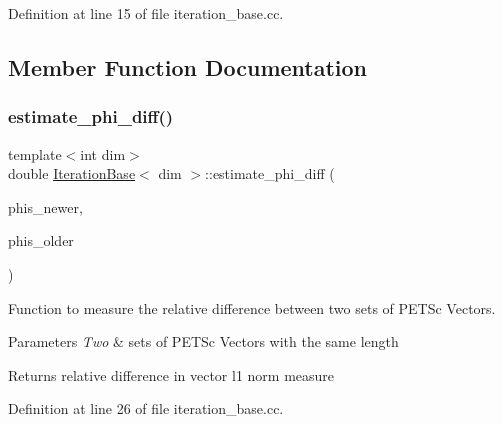 Definition at line 15 of file iteration\+\_\+base.\+cc.



\subsection{Member Function Documentation}
\mbox{\label{class_iteration_base_a8bcba214850c5d47f5ae38fb98f51a44}} 
\subsubsection{\texorpdfstring{estimate\+\_\+phi\+\_\+diff()}{estimate\_phi\_diff()}\hspace{0.1cm}{\footnotesize\ttfamily [1/4]}}
{\footnotesize\ttfamily template$<$int dim$>$ \\
double \hyperlink{class_iteration_base}{Iteration\+Base}$<$ dim $>$\+::estimate\+\_\+phi\+\_\+diff (\begin{DoxyParamCaption}\item[{std\+::vector$<$ P\+E\+T\+Sc\+Wrappers\+::\+M\+P\+I\+::\+Vector $\ast$$>$ \&}]{phis\+\_\+newer,  }\item[{std\+::vector$<$ P\+E\+T\+Sc\+Wrappers\+::\+M\+P\+I\+::\+Vector $\ast$$>$ \&}]{phis\+\_\+older }\end{DoxyParamCaption})\hspace{0.3cm}{\ttfamily [protected]}}



Function to measure the relative difference between two sets of P\+E\+T\+Sc Vectors. 


\begin{DoxyParams}{Parameters}
{\em Two} & sets of P\+E\+T\+Sc Vectors with the same length \\
\hline
\end{DoxyParams}
\begin{DoxyReturn}{Returns}
relative difference in vector l1 norm measure 
\end{DoxyReturn}


Definition at line 26 of file iteration\+\_\+base.\+cc.

\mbox{\label{class_iteration_base_a5b823c5dda090e64bdba2abb815dfbf6}} 

